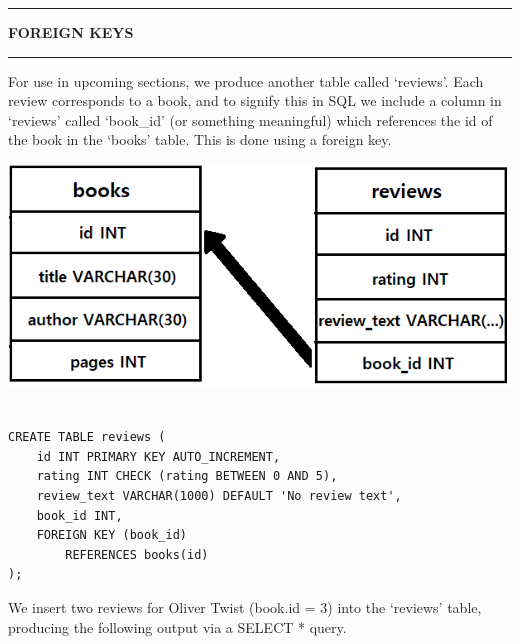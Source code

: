\documentclass[8pt]{extarticle}
\newcommand{\heading}[1]{%
    \noindent
    \rule{\linewidth}{0.4pt}
    \begin{center}
        \vspace{-1ex}
        \textbf{#1}        
        \vspace{-2.5ex}
    \end{center}
    \rule{\linewidth}{0.4pt}
}
\begin{document}
\begin{multicols}{4}
\setlength{\columnseprule}{1pt} %

\heading{FOREIGN KEYS}

For use in upcoming sections, we produce another table called `reviews'. Each review corresponds to a book, and to signify this in SQL we include a column in `reviews' called `book\_id' (or something meaningful) which references the id of the book in the `books' table. This is done using a foreign key.

\begin{center}
\includegraphics[scale = 0.38]{sql_pointer.png}
\end{center}

\begin{lstlisting}[style=sql]

CREATE TABLE reviews (
    id INT PRIMARY KEY AUTO_INCREMENT,
    rating INT CHECK (rating BETWEEN 0 AND 5),
    review_text VARCHAR(1000) DEFAULT 'No review text',
    book_id INT,
    FOREIGN KEY (book_id) 
        REFERENCES books(id)
);
\end{lstlisting}
\vspace{0.5ex}

We insert two reviews for Oliver Twist (book.id = $3$) into the `reviews' table, producing the following output via a SELECT * query.

\begin{center}
\end{center}


\end{multicols}
\end{document}
